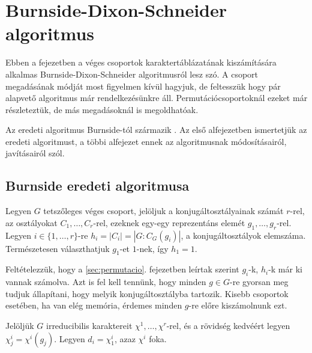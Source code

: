 \section{Burnside-Dixon-Schneider algoritmus}
\label{sec:burnside}
Ebben a fejezetben a véges csoportok karaktertáblázatának kiszámítására alkalmas Burnside-Dixon-Schneider algoritmusról lesz szó.
A csoport megadásának módját most figyelmen kívül hagyjuk, de feltesszük hogy pár alapvető algoritmus már rendelkezésünkre áll.
Permutációcsoportoknál ezeket már részleteztük, de más megadásoknál is megoldhatóak.

Az eredeti algoritmus Burnside-tól származik \cite{Bur11}.
Az első alfejezetben ismertetjük az eredeti algoritmust, a többi alfejezet ennek az algoritmusnak módosításairól, javításairól szól.

\subsection{Burnside eredeti algoritmusa}
\label{subsec:bdseredeti}
Legyen $G$ tetszőleges véges csoport, jelöljuk a konjugáltosztályainak számát $r$-rel, az osztályokat $C_1, \dots, C_r$-rel, ezeknek egy-egy reprezentáns elemét $g_1, \dots, g_r$-rel.
Legyen $i \in \{1, \dots, r\}$-re $h_i=|C_i|=|G:C_G(g_i)|$, a konjugáltosztályok elemszáma.
Természetesen választhatjuk $g_1$-et $1$-nek, így $h_1=1$.

Feltételezzük, hogy a \ref{sec:permutacio}. fejezetben leírtak szerint $g_i$-k, $h_i$-k már ki vannak számolva.
Azt is fel kell tennünk, hogy minden $g\in G$-re gyorsan meg tudjuk állapítani, hogy melyik konjugáltosztályba tartozik.
Kisebb csoportok esetében, ha van elég memória, érdemes minden $g$-re előre kiszámolnunk ezt.

Jelöljük $G$ irreducibilis karaktereit $\chi^1, \dots, \chi^r$-rel, és a rövidség kedvéért legyen $\chi^i_j=\chi^i(g_j)$.
Legyen $d_i=\chi^i_1$, azaz $\chi^i$ foka.

